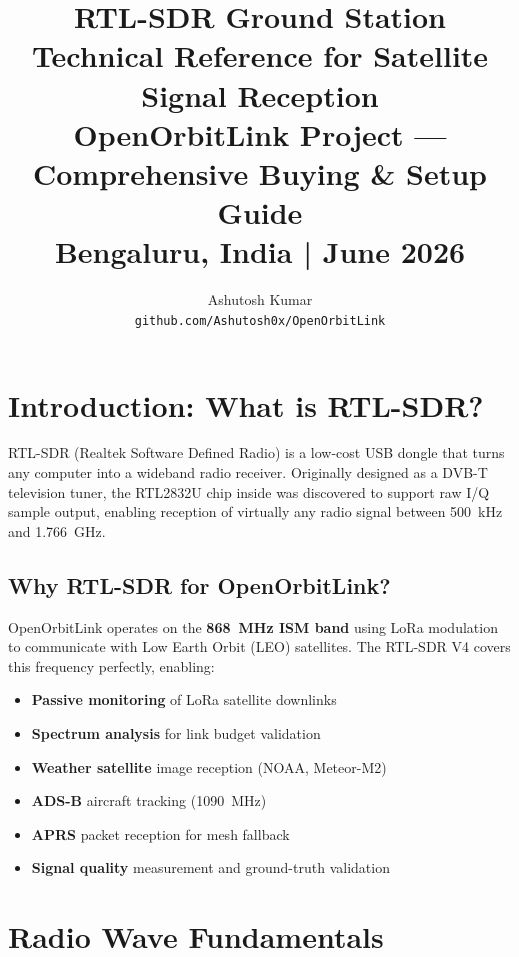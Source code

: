 \documentclass[12pt,a4paper]{article}
\title{
    \vspace{-1cm}
    \textbf{\Huge RTL-SDR Ground Station} \\[0.5cm]
    \textbf{\Large Technical Reference for Satellite Signal Reception} \\[0.3cm]
    \large OpenOrbitLink Project — Comprehensive Buying \& Setup Guide \\[0.2cm]
    \normalsize Bengaluru, India | June 2026
}
\author{Ashutosh Kumar \\ \texttt{github.com/Ashutosh0x/OpenOrbitLink}}
\date{}
\begin{document}
\maketitle
\tableofcontents
\newpage

\section{Introduction: What is RTL-SDR?}

RTL-SDR (Realtek Software Defined Radio) is a low-cost USB dongle that turns any 
computer into a wideband radio receiver. Originally designed as a DVB-T television 
tuner, the RTL2832U chip inside was discovered to support raw I/Q sample output, 
enabling reception of virtually any radio signal between 500~kHz and 1.766~GHz.

\subsection{Why RTL-SDR for OpenOrbitLink?}

OpenOrbitLink operates on the \textbf{868~MHz ISM band} using LoRa modulation to 
communicate with Low Earth Orbit (LEO) satellites. The RTL-SDR V4 covers this 
frequency perfectly, enabling:

\begin{itemize}
    \item \textbf{Passive monitoring} of LoRa satellite downlinks
    \item \textbf{Spectrum analysis} for link budget validation
    \item \textbf{Weather satellite} image reception (NOAA, Meteor-M2)
    \item \textbf{ADS-B} aircraft tracking (1090~MHz)
    \item \textbf{APRS} packet reception for mesh fallback
    \item \textbf{Signal quality} measurement and ground-truth validation
\end{itemize}

\section{Radio Wave Fundamentals}
\end{document}

